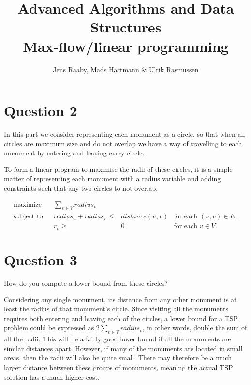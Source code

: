 \documentclass[a4paper, 10pt, oneside, article]{memoir}
\title{Advanced Algorithms and Data Structures\\Max-flow/linear programming}
\author{Jens Raaby, Mads Hartmann \& Ulrik Rasmussen}
\begin{document}
\maketitle


\section*{Question 2}
In this part we consider representing each monument as a circle, so that when all circles are maximum size and do not overlap we have a way of travelling to each monument by entering and leaving every circle.

To form a linear program to maximise the radii of these circles, it is a simple matter of representing each monument with a radius variable and adding constraints such that any two circles to not overlap.

\begin{align*}
  \text{maximize} && \sum_{v\in V} radius_{v} \\
  \text{subject to} && radius_{u} + radius_{v} \leq{}& distance(u,v) & \text{for each $(u,v) \in E$}, \\
                    && r_{v} \geq{}& 0 & \text{for each $v \in V$}.
\end{align*}

\section*{Question 3}
How do you compute a lower bound from these circles?

Considering any single monument, its distance from any other monument is at least the radius of that monument's circle. Since visiting all the monuments requires both entering and leaving each of the circles, a lower bound for a TSP problem could be expressed as $2 \sum_{v \in V} radius_{v}$, in other words, double the sum of all the radii.
This will be a fairly good lower bound if all the monuments are similar distances apart. However, if many of the monuments are located in small areas, then the radii will also be quite small. There may therefore be a much larger distance between these groups of monuments, meaning the actual TSP solution has a much higher cost.



\end{document}
